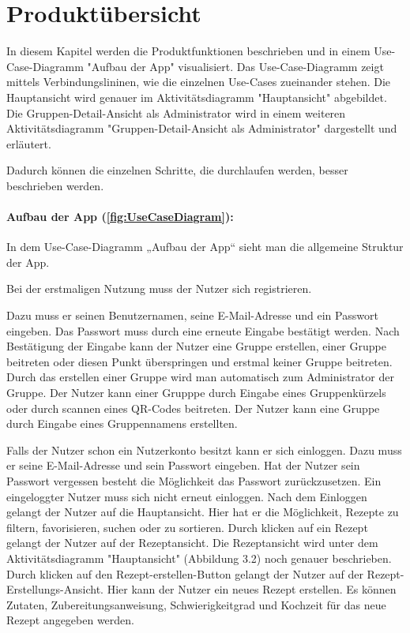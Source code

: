 \documentclass[parskip=full]{scrartcl}
\begin{document}
\section{Produktübersicht}

In diesem Kapitel werden die Produktfunktionen beschrieben und in einem Use-Case-Diagramm "Aufbau der App" visualisiert.
Das Use-Case-Diagramm zeigt mittels Verbindungslininen, wie die einzelnen Use-Cases zueinander stehen.
Die Hauptansicht wird genauer im Aktivitätsdiagramm "Hauptansicht" abgebildet.
Die Gruppen-Detail-Ansicht als Administrator wird in einem weiteren Aktivitätsdiagramm "Gruppen-Detail-Ansicht als Administrator" dargestellt und erläutert.

Dadurch können die einzelnen Schritte, die durchlaufen werden, besser beschrieben werden.\par


\paragraph{Aufbau der App (\autoref{fig:UseCaseDiagram}):}

In dem Use-Case-Diagramm „Aufbau der App“ sieht man die allgemeine Struktur der App.

Bei der erstmaligen Nutzung muss der Nutzer sich registrieren.

Dazu muss er seinen Benutzernamen, seine E-Mail-Adresse und ein Passwort eingeben.
Das Passwort muss durch eine erneute Eingabe bestätigt werden.
Nach Bestätigung der Eingabe kann der Nutzer eine Gruppe erstellen, einer Gruppe beitreten oder diesen Punkt überspringen und erstmal keiner Gruppe beitreten.
Durch das erstellen einer Gruppe wird man automatisch zum Administrator der Gruppe.
Der Nutzer kann einer Grupppe durch Eingabe eines Gruppenkürzels oder durch scannen eines QR-Codes beitreten.
Der Nutzer kann eine Gruppe durch Eingabe eines Gruppennamens erstellten.

Falls der Nutzer schon ein Nutzerkonto besitzt kann er sich einloggen.
Dazu muss er seine E-Mail-Adresse und sein Passwort eingeben.
Hat der Nutzer sein Passwort vergessen besteht die Möglichkeit das Passwort zurückzusetzen.
Ein eingeloggter Nutzer muss sich nicht erneut einloggen.\newline
Nach dem Einloggen gelangt der Nutzer auf die Hauptansicht.
Hier hat er die Möglichkeit, Rezepte zu filtern, favorisieren, suchen oder zu sortieren.
Durch klicken auf ein Rezept gelangt der Nutzer auf der Rezeptansicht.
Die Rezeptansicht wird unter dem Aktivitätsdiagramm "Hauptansicht" (Abbildung 3.2) noch genauer beschrieben.
Durch klicken auf den Rezept-erstellen-Button gelangt der Nutzer auf der Rezept-Erstellungs-Ansicht.
Hier kann der Nutzer ein neues Rezept erstellen.
Es können Zutaten, Zubereitungsanweisung, Schwierigkeitgrad und Kochzeit ƒür das neue Rezept angegeben werden.
\end{document}
